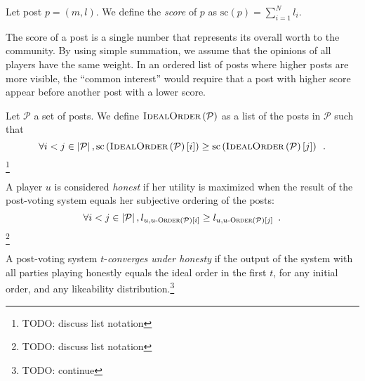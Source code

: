     \begin{definition}
      Let post $p = \left(m, l\right)$. We define the \emph{score} of $p$ as
      $\mathrm{sc}\left(p\right) = \sum\limits_{i = 1}^N l_i$.
    \end{definition}
    The score of a post is a single number that represents its overall worth to
    the community. By using simple summation, we assume that the opinions of all
    players have the same weight. In an ordered list of posts where higher posts
    are more visible, the ``common interest'' would require that a post with
    higher score appear before another post with a lower score.

    \begin{definition}
      Let $\mathcal{P}$ a set of posts. We define
      $\textsc{IdealOrder}\left(\mathcal{P}\right)$ as a list of the posts in
      $\mathcal{P}$ such that
      \begin{equation*}
        \forall i < j \in \left|\mathcal{P}\right|,
        \mathrm{sc}\left(\textsc{IdealOrder}
        \left(\mathcal{P}\right)\left[i\right]\right) \geq
        \mathrm{sc}\left(\textsc{IdealOrder}
        \left(\mathcal{P}\right)\left[j\right]\right) \enspace.
      \end{equation*}\footnote{TODO: discuss list notation}
    \end{definition}


    \begin{definition}
      A player $u$ is considered \emph{honest} if her utility is maximized
      when the result of the post-voting system equals her subjective ordering
      of the posts:
      \begin{equation*}
        \forall i < j \in \left|\mathcal{P}\right|, l_{u, u\textsc{-Order}
        \left(\mathcal{P}\right)\left[i\right]} \geq l_{u, u\textsc{-Order}
        \left(\mathcal{P}\right)\left[j\right]}
        \enspace.
      \end{equation*}\footnote{TODO: discuss list notation}
    \end{definition}

    \begin{definition}
      A post-voting system $t$-\emph{converges under honesty} if the output of
      the system with all parties playing honestly equals the ideal order in the
      first $t$, for any initial order, and any likeability
      distribution.\footnote{TODO: continue}
    \end{definition}


